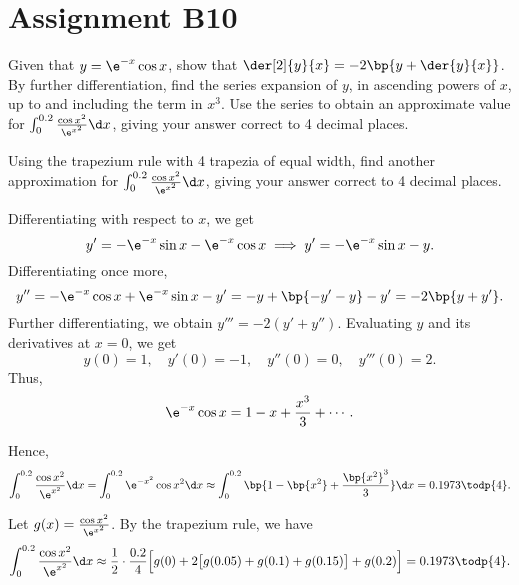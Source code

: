 \section{Assignment B10}

\begin{problem}
    Given that $y = \e^{-x}\cos x$, show that $\der[2]{y}{x} = -2\bp{y + \der{y}{x}}$. By further differentiation, find the series expansion of $y$, in ascending powers of $x$, up to and including the term in $x^3$. Use the series to obtain an approximate value for $\int_0^{0.2} \frac{\cos x^2}{\e^{x^2}} \d x$, giving your answer correct to 4 decimal places.

    Using the trapezium rule with 4 trapezia of equal width, find another approximation for $\int_0^{0.2}\frac{\cos x^2}{\e^{x^2}} \d x$, giving your answer correct to 4 decimal places.
\end{problem}
\begin{solution}
    Differentiating with respect to $x$, we get \[y' = -\e^{-x}\sin x - \e^{-x} \cos x \implies y' = -\e^{-x} \sin x - y.\] Differentiating once more, \[y'' = -\e^{-x} \cos x + \e^{-x} \sin x - y' = -y + \bp{-y' - y} - y' = -2\bp{y + y'}.\] Further differentiating, we obtain $y''' = -2(y' + y'')$. Evaluating $y$ and its derivatives at $x = 0$, we get \[y(0) = 1, \quad y'(0) = -1, \quad y''(0) = 0, \quad y'''(0) = 2.\] Thus, \[\e^{-x}\cos x = 1 - x + \frac{x^3}3 + \cdots.\]

    Hence, \[\int_0^{0.2} \frac{\cos x^2}{\e^{x^2}} \d x = \int_0^{0.2} \e^{-{x^2}}\cos x^2 \d x \approx \int_0^{0.2} \bp{1 - \bp{x^2} + \frac{\bp{x^2}^3}3} \d x = 0.1973 \todp{4}.\]

    Let $g(x) = \frac{\cos x^2}{\e^{x^2}}$. By the trapezium rule, we have \[\int_0^{0.2} \frac{\cos x^2}{\e^{x^2}} \d x \approx \frac12 \cdot \frac{0.2}{4} \Big[g(0) + 2\big[g(0.05) + g(0.1) + g(0.15)\big] + g(0.2)\Big] = 0.1973 \todp{4}.\]
\end{solution}

